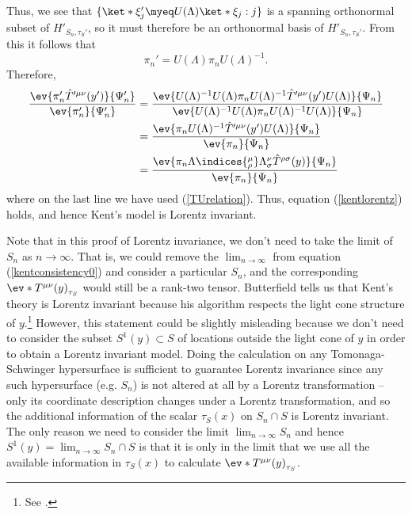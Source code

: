 \documentclass[12pt]{report}
\begin{document}
Thus, we see that $\{\ket*{\xi_j'}\myeq U(\Lambda)\ket*{\xi_j}:j\}$ is a spanning orthonormal subset of $H'_{S_n,\tau_S'}$, so it must therefore be an orthonormal basis of $H'_{S_n,\tau_S'}$. From this it follows that 
\begin{equation}\label{pipidash}
\pi_n'=U(\Lambda)\pi_nU(\Lambda)^{-1}.
\end{equation}
Therefore, 
\begin{equation}\label{kentlorentz2}
\begin{split}
\frac{\ev{\pi_n'\hat{T}^{\prime\mu\nu}(y')}{\Psi_n'}}{\ev{\pi_n'}{\Psi_n'}}&=\frac{\ev{U(\Lambda)^{-1}U(\Lambda)\pi_nU(\Lambda)^{-1}\hat{T}^{\prime\mu\nu}(y')U(\Lambda)}{\Psi_n}}{\ev{U(\Lambda)^{-1}U(\Lambda)\pi_n U(\Lambda)^{-1}U(\Lambda)}{\Psi_n}}\\
&=\frac{\ev{\pi_nU(\Lambda)^{-1}\hat{T}^{\prime\mu\nu}(y')U(\Lambda)}{\Psi_n}}{\ev{\pi_n}{\Psi_n}}\\
&=\frac{\ev{\pi_n\Lambda\indices{^\mu_\rho}\Lambda{^\nu_\sigma}\hat{T}^{\rho\sigma}(y)}{\Psi_n}}{\ev{\pi_n }{\Psi_n}}
\end{split}
\end{equation}
where on the last line we have used (\ref{TUrelation}). Thus, equation (\ref{kentlorentz}) holds, and hence Kent's model is Lorentz invariant.

Note that in this proof of Lorentz invariance, we don't need to take the limit of $S_n$ as $n\rightarrow\infty$. That is, we could remove the $\lim_{n\rightarrow\infty}$ from equation (\ref{kentconsistency0}) and consider a particular $S_n$, and the corresponding $\ev*{T^{\mu\nu}(y)}_{\tau_S}$ would still be a rank-two tensor. Butterfield tells us that Kent's theory is  Lorentz invariant because his algorithm respects the light cone structure of $y$.\footnote{See \cite[30]{Butterfield}.} However, this statement could be slightly misleading because we don't need to consider the subset $S^1(y)\subset S$ of locations outside the light cone of $y$ in order to obtain a Lorentz invariant model. Doing the calculation on any Tomonaga-Schwinger hypersurface is sufficient to guarantee Lorentz invariance since any such hypersurface (e.g. $S_n$) is not altered at all by a Lorentz transformation -- only its coordinate description changes under a Lorentz transformation, and so the additional information of the scalar $\tau_S(x)$ on $S_n\cap S$ is Lorentz invariant. The only reason we need to consider the limit $\lim_{n\rightarrow \infty}S_n$ and hence $S^1(y)=\lim_{n\rightarrow \infty}S_n\cap S$ is that it is only in the limit that we use all the available information in $\tau_S(x)$ to calculate $\ev*{T^{\mu\nu}(y)}_{\tau_S}$. 
\end{document}
